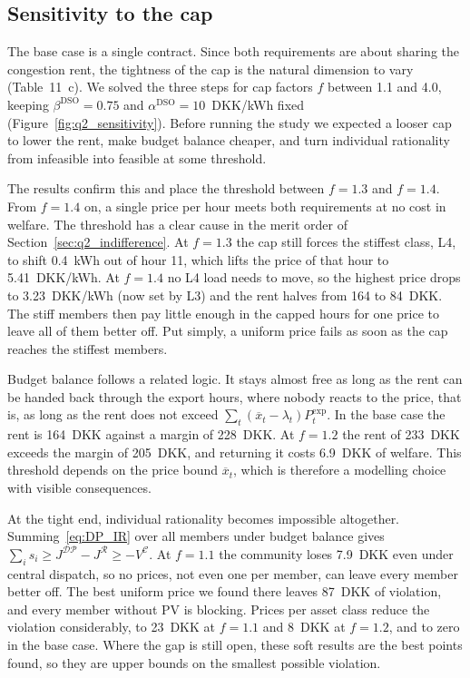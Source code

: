 \subsection{Sensitivity to the cap}\label{sec:q2_sensitivity}
The base case is a single contract.
Since both requirements are about sharing the congestion rent, the tightness of the cap is the natural dimension to vary (Table~11~c).
We solved the three steps for cap factors $f$ between 1.1 and 4.0, keeping $\beta^{\mathrm{DSO}}=0.75$ and $\alpha^{\mathrm{DSO}}=10$~DKK/kWh fixed (Figure~\ref{fig:q2_sensitivity}).
Before running the study we expected a looser cap to lower the rent, make budget balance cheaper, and turn individual rationality from infeasible into feasible at some threshold.

The results confirm this and place the threshold between $f=1.3$ and $f=1.4$.
From $f=1.4$ on, a single price per hour meets both requirements at no cost in welfare.
The threshold has a clear cause in the merit order of Section~\ref{sec:q2_indifference}.
At $f=1.3$ the cap still forces the stiffest class, L4, to shift 0.4~kWh out of hour 11, which lifts the price of that hour to 5.41~DKK/kWh.
At $f=1.4$ no L4 load needs to move, so the highest price drops to 3.23~DKK/kWh (now set by L3) and the rent halves from 164 to 84~DKK.
The stiff members then pay little enough in the capped hours for one price to leave all of them better off.
Put simply, a uniform price fails as soon as the cap reaches the stiffest members.

Budget balance follows a related logic.
It stays almost free as long as the rent can be handed back through the export hours, where nobody reacts to the price, that is, as long as the rent does not exceed $\sum_t(\overline{x}_t-\lambda_t)P^{\mathrm{exp}}_t$.
In the base case the rent is 164~DKK against a margin of 228~DKK.
At $f=1.2$ the rent of 233~DKK exceeds the margin of 205~DKK, and returning it costs 6.9~DKK of welfare.
This threshold depends on the price bound $\overline{x}_t$, which is therefore a modelling choice with visible consequences.

At the tight end, individual rationality becomes impossible altogether.
Summing~\eqref{eq:DP_IR} over all members under budget balance gives $\sum_is_i\geq J^{\mathcal{DP}}-J^{\mathcal{R}}\geq-V^{\mathcal{C}}$.
At $f=1.1$ the community loses 7.9~DKK even under central dispatch, so no prices, not even one per member, can leave every member better off.
The best uniform price we found there leaves 87~DKK of violation, and every member without PV is blocking.
Prices per asset class reduce the violation considerably, to 23~DKK at $f=1.1$ and 8~DKK at $f=1.2$, and to zero in the base case.
Where the gap is still open, these soft results are the best points found, so they are upper bounds on the smallest possible violation.

